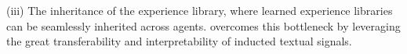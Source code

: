 (iii) The inheritance of the experience library, where learned experience libraries can be seamlessly inherited across agents. \method{} overcomes this bottleneck by leveraging the great transferability and interpretability of inducted textual signals.
